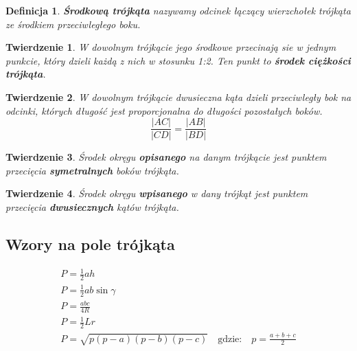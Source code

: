\documentclass{report}
\newtheorem*{definition}{Definicja}
\newtheorem{theorem}{Twierdzenie}
\begin{document}
      \begin{definition}
        \textbf{Środkową trójkąta} nazywamy odcinek łączący wierzchołek trójkąta ze środkiem przeciwległego boku.
      \end{definition}
      \begin{theorem}
        W dowolnym trójkącie jego środkowe przecinają sie w jednym punkcie, który dzieli każdą z nich w stosunku 1:2. Ten punkt to \textbf{środek ciężkości trójkąta}.
      \end{theorem}
      \begin{theorem}
        W dowolnym trójkącie dwusieczna kąta dzieli przeciwległy bok na odcinki, których długość jest proporcjonalna do długości pozostałych boków.
        \begin{equation}
          \frac{|AC|}{|CD|} = \frac{|AB|}{|BD|}
        \end{equation}
      \end{theorem}
      \begin{theorem}
        Środek okręgu \textbf{opisanego} na danym trójkącie jest punktem przecięcia \textbf{symetralnych} boków trójkąta.
      \end{theorem}
      \begin{theorem}
        Środek okręgu \textbf{wpisanego} w dany trójkąt jest punktem przecięcia \textbf{dwusiecznych} kątów trójkąta.
      \end{theorem}
      \subsection{Wzory na pole trójkąta}
        \begin{gather}
          P = \frac 12ah\\
          P = \frac 12ab\sin\gamma\\
          P = \frac{abc}{4R}\\
          P = \frac 12Lr\\
          P = \sqrt{p(p-a)(p-b)(p-c)}\quad\text{gdzie:}\quad p = \frac{a+b+c}{2}
        \end{gather}
\end{document}
